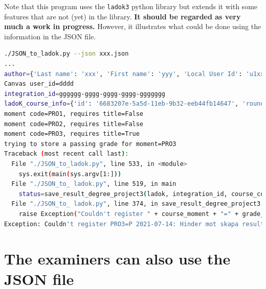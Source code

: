 Note that this program uses the \texttt{ladok3} python library but extends it with some features that are not (yet) in the library. \textbf{It should be regarded as very much a work in progress.} However, it illustrates what could be done using the information in the JSON file.
\begin{lstlisting}[language={bash},
    breaklines=true,
    breakatwhitespace=true,          % sets if automatic breaks should only happen at whitespace
    breakindent=0em,
    caption={Using the extracted JSON to produce a LADOK entry for a student in the DA231X degree project course}, label=lst:usingExtractedJSONtoProduceLADOKentry1]
./JSON_to_ladok.py --json xxx.json 
...
author={'Last name': 'xxx', 'First name': 'yyy', 'Local User Id': 'u1xxxx', 'E-mail': 'oxxx@kth.se', 'organisation': {'L1': 'School of Electrical Engineering and Computer Science '}}
Canvas user_id=dddd
integration_id=gggggg-gggg-gggg-gggg-ggggggg
ladoK_course_info={'id': '6683207e-5a5d-11eb-9b32-eeb44fb14647', 'round_id': '8e15ae14-1d86-11ea-a622-3565135944de', 'education_id': '374ea085-73d8-11e8-afa7-8e408e694e54', 'instance_id': '8eee8da9-dd0a-11e8-bb7a-19f8cd1a470e', 'swe_name': 'Examensarbete i datalogi och datateknik, avancerad nivå', 'eng_name': 'Degree Project in Computer Science and Engineering, Second Cycle'}
moment code=PRO1, requires title=False
moment code=PRO2, requires title=False
moment code=PRO3, requires title=True
trying to store a passing grade for moment=PRO3
Traceback (most recent call last):
  File "./JSON_to_ladok.py", line 533, in <module>
    sys.exit(main(sys.argv[1:]))
  File "./JSON_to_ ladok.py", line 519, in main
    status=save_result_degree_project3(ladok, integration_id, course_code, mom['Utbildningskod'], '2021-07-14', 'P', "PF", main_title, alternative_main_title)
  File "./JSON_to_ ladok.py", line 374, in save_result_degree_project3
    raise Exception("Couldn't register " + course_moment + "=" + grade_raw + " " + result_date_raw + ": " + r.json()["Meddelande"])
Exception: Couldn't register PRO3=P 2021-07-14: Hinder mot skapa resultat påträffat: Rapporteringsrättighet saknas
\end{lstlisting}



\section{The examiners can also use the JSON file}

